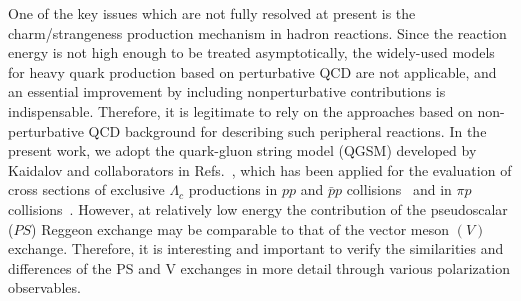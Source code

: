 \documentclass[a4paper,12pt]{article}
\begin{document}
One of the key issues which are not fully resolved at present is the
charm/strangeness production mechanism in hadron reactions.
Since the reaction energy is not high enough to be treated asymptotically, the widely-used models
for heavy quark production based on perturbative QCD are not
applicable, and an essential improvement by including nonperturbative
contributions is indispensable.
Therefore, it is legitimate to rely on the approaches based on non-perturbative QCD
background for describing such peripheral reactions.
In the present work, we adopt the quark-gluon string model (QGSM) developed by Kaidalov and
collaborators in Refs.~\cite{Kaidalov80,Kaidalov82}, which has been applied for the evaluation
of cross sections of exclusive $\Lambda_c$ productions in $pp$ and
$\bar{p} p$ collisions~\cite{TK08,KKMW11} and in $\pi p$
collisions~\cite{BK83,KHKN15,KKH16,SOT}.
However, at relatively low energy the contribution of the pseudoscalar ($PS$) Reggeon exchange may be
comparable to that of the vector meson $(V)$ exchange.
Therefore, it is interesting and important to verify the similarities and differences of the PS and V exchanges in more detail
through various polarization observables.
\end{document}
